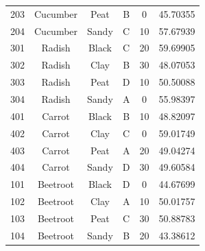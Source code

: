 \documentclass{article}
\begin{document}
\begin{table}[h]
\begin{tabular}{|c|c|c|c|c|c|}
203 & Cucumber & Peat & B & 0 & 45.70355 \\
204 & Cucumber & Sandy & C & 10 & 57.67939 \\
301 & Radish & Black & C & 20 & 59.69905 \\
302 & Radish & Clay & B & 30 & 48.07053 \\
303 & Radish & Peat & D & 10 & 50.50088 \\
304 & Radish & Sandy & A & 0 & 55.98397 \\
401 & Carrot & Black & B & 10 & 48.82097 \\
402 & Carrot & Clay & C & 0 & 59.01749 \\
403 & Carrot & Peat & A & 20 & 49.04274 \\
404 & Carrot & Sandy & D & 30 & 49.60584 \\
101 & Beetroot & Black & D & 0 & 44.67699 \\
102 & Beetroot & Clay & A & 10 & 50.01757 \\
103 & Beetroot & Peat & C & 30 & 50.88783 \\
104 & Beetroot & Sandy & B & 20 & 43.38612 \\


\end{tabular}

\label{tab:agri-experiment}
\end{table}
\end{document}
